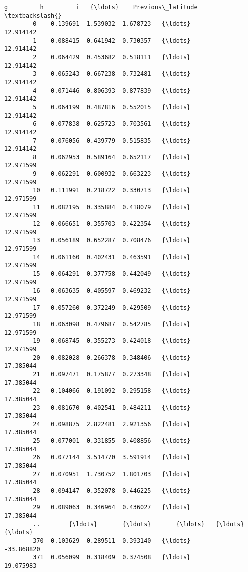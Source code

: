 \documentclass[11pt]{article}
\begin{document}
\begin{Verbatim}[commandchars=\\\{\}]
                    g         h         i   {\ldots}    Previous\_latitude  \textbackslash{}
        0    0.139691  1.539032  1.678723   {\ldots}            12.914142   
        1    0.088415  0.641942  0.730357   {\ldots}            12.914142   
        2    0.064429  0.453682  0.518111   {\ldots}            12.914142   
        3    0.065243  0.667238  0.732481   {\ldots}            12.914142   
        4    0.071446  0.806393  0.877839   {\ldots}            12.914142   
        5    0.064199  0.487816  0.552015   {\ldots}            12.914142   
        6    0.077838  0.625723  0.703561   {\ldots}            12.914142   
        7    0.076056  0.439779  0.515835   {\ldots}            12.914142   
        8    0.062953  0.589164  0.652117   {\ldots}            12.971599   
        9    0.062291  0.600932  0.663223   {\ldots}            12.971599   
        10   0.111991  0.218722  0.330713   {\ldots}            12.971599   
        11   0.082195  0.335884  0.418079   {\ldots}            12.971599   
        12   0.066651  0.355703  0.422354   {\ldots}            12.971599   
        13   0.056189  0.652287  0.708476   {\ldots}            12.971599   
        14   0.061160  0.402431  0.463591   {\ldots}            12.971599   
        15   0.064291  0.377758  0.442049   {\ldots}            12.971599   
        16   0.063635  0.405597  0.469232   {\ldots}            12.971599   
        17   0.057260  0.372249  0.429509   {\ldots}            12.971599   
        18   0.063098  0.479687  0.542785   {\ldots}            12.971599   
        19   0.068745  0.355273  0.424018   {\ldots}            12.971599   
        20   0.082028  0.266378  0.348406   {\ldots}            17.385044   
        21   0.097471  0.175877  0.273348   {\ldots}            17.385044   
        22   0.104066  0.191092  0.295158   {\ldots}            17.385044   
        23   0.081670  0.402541  0.484211   {\ldots}            17.385044   
        24   0.098875  2.822481  2.921356   {\ldots}            17.385044   
        25   0.077001  0.331855  0.408856   {\ldots}            17.385044   
        26   0.077144  3.514770  3.591914   {\ldots}            17.385044   
        27   0.070951  1.730752  1.801703   {\ldots}            17.385044   
        28   0.094147  0.352078  0.446225   {\ldots}            17.385044   
        29   0.089063  0.346964  0.436027   {\ldots}            17.385044   
        ..        {\ldots}       {\ldots}       {\ldots}   {\ldots}                  {\ldots}   
        370  0.103629  0.289511  0.393140   {\ldots}           -33.868820   
        371  0.056099  0.318409  0.374508   {\ldots}            19.075983   

\end{Verbatim}
\end{document}
